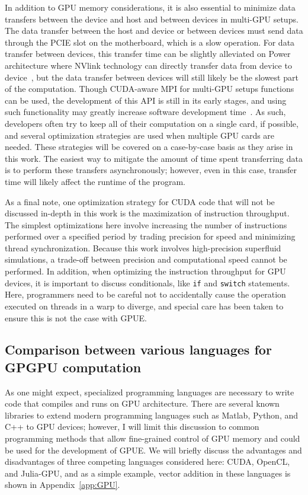 In addition to GPU memory considerations, it is also essential to minimize data transfers between the device and host and between devices in multi-GPU setups.
The data transfer between the host and device or between devices must send data through the PCIE slot on the motherboard, which is a slow operation.
For data transfer between devices, this transfer time can be slightly alleviated on Power architecture where NVlink technology can directly transfer data from device to device~\cite{foley2017}, but the data transfer between devices will still likely be the slowest part of the computation.
Though CUDA-aware MPI for multi-GPU setups functions can be used, the development of this API is still in its early stages, and using such functionality may greatly increase software development time~\cite{lonvcar2016, wang2013}.
As such, developers often try to keep all of their computation on a single card, if possible, and several optimization strategies are used when multiple GPU cards are needed.
These strategies will be covered on a case-by-case basis as they arise in this work.
The easiest way to mitigate the amount of time spent transferring data is to perform these transfers asynchronously; however, even in this case, transfer time will likely affect the runtime of the program.

As a final note, one optimization strategy for CUDA code that will not be discussed in-depth in this work is the maximization of instruction throughput.
The simplest optimizations here involve increasing the number of instructions performed over a specified period by trading precision for speed and minimizing thread synchronization.
Because this work involves high-precision superfluid simulations, a trade-off between precision and computational speed cannot be performed.
In addition, when optimizing the instruction throughput for GPU devices, it is important to discuss conditionals, like \texttt{if} and \texttt{switch} statements.
Here, programmers need to be careful not to accidentally cause the operation executed on threads in a warp to diverge, and special care has been taken to ensure this is not the case with GPUE.


\subsection{Comparison between various languages for GPGPU computation}
\label{sec:compare}

As one might expect, specialized programming languages are necessary to write code that compiles and runs on GPU architecture.
There are several known libraries to extend modern programming languages such as Matlab, Python, and C++ to GPU devices; however, I will limit this discussion to common programming methods that allow fine-grained control of GPU memory and could be used for the development of GPUE.
We will briefly discuss the advantages and disadvantages of three competing languages considered here: CUDA, OpenCL, and Julia-GPU, and as a simple example, vector addition in these languages is shown in  Appendix~\ref{app:GPU}.

